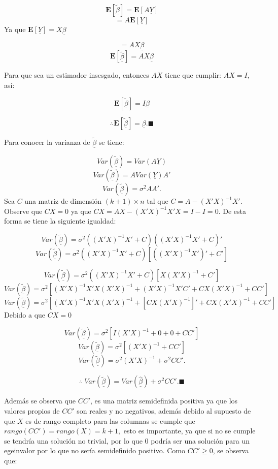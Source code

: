\documentclass[
  a4paper,
  oneside,
  openany]{book}
\begin{document}
\[
\mathbf{E}\left[\underline{\tilde{\beta}}\right]=\mathbf{E}\left[ A\underline{Y} \right]
\]
\[
=A \mathbf{E}[\underline{Y}]
\]
Ya que \(\mathbf{E}[\underline{Y}]=X\underline{\beta}\)

\[
=AX\underline{\beta}
\]
\[
\mathbf{E}\left[\underline{\tilde{\beta}}\right]=AX\underline{\beta}
\]

Para que sea un estimador insesgado, entonces \(AX\) tiene que cumplir: \(AX=I\), así:

\[
\mathbf{E}\left[\underline{\tilde{\beta}}\right]=I\underline{\beta}
\]

\[
\therefore \mathbf{E}\left[\underline{\tilde{\beta}}\right]=\underline{\beta}.\blacksquare
\]

Para conocer la varianza de \(\underline{\tilde{\beta}}\) se tiene:

\[
Var\left(\underline{\tilde{\beta}}\right)= Var(A\underline{Y})
\]
\[
Var\left(\underline{\tilde{\beta}}\right)=A Var(\underline{Y})A'
\]
\[
Var\left(\underline{\tilde{\beta}}\right)=\sigma^2 AA'.
\]
Sea \(C\) una matriz de dimensión \((k+1) \times n\) tal que \(C=A-(X'X)^{-1}X'\). Observe que \(CX=0\) ya que \(CX=AX-(X'X)^{-1}X'X=I-I=0.\)
De esta forma se tiene la siguiente igualdad:

\[
Var\left(\underline{\tilde{\beta}}\right)=\sigma^2((X'X)^{-1}X'+C)((X'X)^{-1}X'+C)'
\]
\[
Var\left(\underline{\tilde{\beta}}\right)=\sigma^2((X'X)^{-1}X'+C)\left[ ((X'X)^{-1}X')'+C'\right]
\]

\[
Var\left(\underline{\tilde{\beta}}\right)=\sigma^2((X'X)^{-1}X'+C)[X(X'X)^{-1}+C']
\]
\[
Var\left(\underline{\tilde{\beta}}\right)=\sigma^2[(X'X)^{-1}X'X(X'X)^{-1}+(X'X)^{-1}X'C'+CX(X'X)^{-1}+CC']
\]
\[
Var\left(\underline{\tilde{\beta}}\right)=\sigma^2\left[(X'X)^{-1}X'X(X'X)^{-1}+[CX(X'X)^{-1}]'+CX(X'X)^{-1}+CC'\right]
\]
Debido a que \(CX=0\)

\[
Var\left(\underline{\tilde{\beta}}\right)=\sigma^2\left[ I(X'X)^{-1}+0+0+CC'\right]
\]
\[
Var\left(\underline{\tilde{\beta}}\right)=\sigma^2[(X'X)^{-1}+CC']
\]
\[
Var\left(\underline{\tilde{\beta}}\right)=\sigma^2(X'X)^{-1}+\sigma^2CC'.
\]

\[
\therefore \  Var\left(\underline{\tilde{\beta}}\right)=Var\left(\underline{\hat{\beta}}\right)+\sigma^2CC'. \blacksquare
\]

Además se observa que \(CC'\), es una matriz semidefinida positiva ya que los valores propios de \(CC'\) son reales y no negativos, además debido al supuesto de que \(X\) es de rango completo para las columnas se cumple que \(rango(CC')=rango(X)=k+1,\) esto es importante, ya que si no se cumple se tendría una solución no trivial, por lo que \(0\) podría ser una solución para un egeinvalor por lo que no sería semidefinido positivo. Como \(CC'\geq0\), se observa que:
\end{document}
